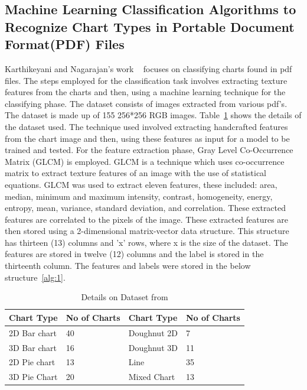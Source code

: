\documentclass[12pt, a4paper,oneside]{report}
\begin{document}
\subsection{Machine Learning Classification Algorithms to Recognize Chart Types in Portable Document Format(PDF) Files}
Karthikeyani and Nagarajan's work ~\cite{karthikeyani2012machine} focuses on classifying charts found in pdf files. The steps employed for the classification task involves extracting texture features from the charts and then, using a machine learning technique for the classifying phase. The dataset consists of images extracted from various pdf's. The dataset is made up of 155 256*256 RGB images. Table~\ref{table:pdf} shows the details of the dataset used.
The technique used involved extracting handcrafted features from the chart image and then, using these features as input for a model to be trained and tested. For the feature extraction phase, Gray Level Co-Occurrence Matrix (GLCM) is employed. GLCM is a technique which uses co-occurrence matrix to extract texture features of an image with the use of statistical equations. GLCM was used to extract eleven features, these included: area, median, minimum and maximum intensity, contrast, homogeneity, energy, entropy, mean, variance, standard deviation, and correlation. These extracted features are correlated to the pixels of the image. These extracted features are then stored using a 2-dimensional matrix-vector data structure. This structure has thirteen (13) columns and 'x' rows, where x is the size of the dataset. The features are stored in twelve (12) columns and the label is stored in the thirteenth column. The features and labels were stored in the below structure~\ref{alg:1}.

\begin{table}[h]
	\centering {} \small
	\begin{tabular}{|p{3cm}|p{3cm}|p{3cm}|p{3cm}|}
		\hline
		Chart Type & No of Charts & Chart
		Type & No of Charts  \\ \hline
		2D Bar chart & 40 & Doughnut 2D & 7 \\ \hline
		3D Bar chart & 16 & Doughnut 3D & 11\\ \hline
		2D Pie chart & 13 & Line & 35 \\ \hline
		3D Pie Chart & 20 & Mixed Chart& 13 \\ \hline
	\end{tabular}
	\caption {Details on Dataset from \cite{karthikeyani2012machine} }	
	\label{table:pdf}
\end{table}
\end{document}
